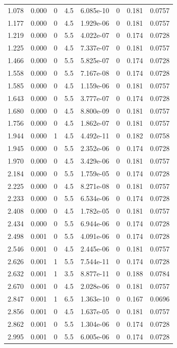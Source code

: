 \documentclass[preview]{standalone}
\begin{document}
{{\begin{tabular}{L{1.2cm}C{1.2cm} C{0.3cm}C{0.5cm} C{1.4cm}C{1.4cm} C{1.4cm}C{1.4cm}}
  1.078  &  0.000  & 0     & 4.5 &  6.085e-10  & 0  & 0.181 &  0.0757   \\ 
  1.177  &  0.000  & 0     & 4.5 &  1.929e-06  & 0  & 0.181 &  0.0757   \\ 
  1.219  &  0.000  & 0     & 5.5 &  4.022e-07  & 0  & 0.174 &  0.0728   \\ 
  1.225  &  0.000  & 0     & 4.5 &  7.337e-07  & 0  & 0.181 &  0.0757   \\ 
  1.466  &  0.000  & 0     & 5.5 &  5.825e-07  & 0  & 0.174 &  0.0728   \\ 
  1.558  &  0.000  & 0     & 5.5 &  7.167e-08  & 0  & 0.174 &  0.0728   \\ 
  1.585  &  0.000  & 0     & 4.5 &  1.159e-06  & 0  & 0.181 &  0.0757   \\ 
  1.643  &  0.000  & 0     & 5.5 &  3.777e-07  & 0  & 0.174 &  0.0728   \\ 
  1.680  &  0.000  & 0     & 4.5 &  8.800e-09  & 0  & 0.181 &  0.0757   \\ 
  1.756  &  0.000  & 0     & 4.5 &  1.862e-07  & 0  & 0.181 &  0.0757   \\ 
  1.944  &  0.000  & 1     & 4.5 &  4.492e-11  & 0  & 0.182 &  0.0758   \\ 
  1.945  &  0.000  & 0     & 5.5 &  2.352e-06  & 0  & 0.174 &  0.0728   \\ 
  1.970  &  0.000  & 0     & 4.5 &  3.429e-06  & 0  & 0.181 &  0.0757   \\ 
  2.184  &  0.000  & 0     & 5.5 &  1.759e-05  & 0  & 0.174 &  0.0728   \\ 
  2.225  &  0.000  & 0     & 4.5 &  8.271e-08  & 0  & 0.181 &  0.0757   \\ 
  2.233  &  0.000  & 0     & 5.5 &  6.534e-06  & 0  & 0.174 &  0.0728   \\ 
  2.408  &  0.000  & 0     & 4.5 &  1.782e-05  & 0  & 0.181 &  0.0757   \\ 
  2.434  &  0.000  & 0     & 5.5 &  6.944e-06  & 0  & 0.174 &  0.0728   \\ 
  2.498  &  0.001  & 0     & 5.5 &  4.091e-06  & 0  & 0.174 &  0.0728   \\ 
  2.546  &  0.001  & 0     & 4.5 &  2.445e-06  & 0  & 0.181 &  0.0757   \\ 
  2.626  &  0.001  & 1     & 5.5 &  7.544e-11  & 0  & 0.174 &  0.0728   \\ 
  2.632  &  0.001  & 1     & 3.5 &  8.877e-11  & 0  & 0.188 &  0.0784   \\ 
  2.670  &  0.001  & 0     & 4.5 &  2.028e-06  & 0  & 0.181 &  0.0757   \\ 
  2.847  &  0.001  & 1     & 6.5 &  1.363e-10  & 0  & 0.167 &  0.0696   \\ 
  2.856  &  0.001  & 0     & 4.5 &  1.637e-05  & 0  & 0.181 &  0.0757   \\ 
  2.862  &  0.001  & 0     & 5.5 &  1.304e-06  & 0  & 0.174 &  0.0728   \\ 
  2.995  &  0.001  & 0     & 5.5 &  6.005e-06  & 0  & 0.174 &  0.0728   \\ 
\hline 
\end{tabular} 

}}
\end{document}
